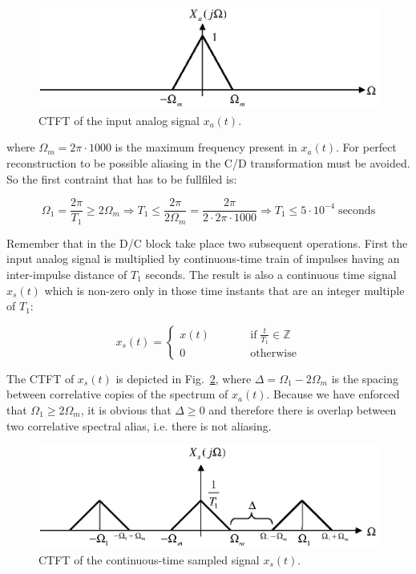 \documentclass[a4paper,11pt,oneside]{article}
\begin{document}
\begin{figure}[h!]
\centering
\includegraphics[width=.8\textwidth]{ctftxa.eps}
\caption{CTFT of the input analog signal $x_a(t)$.}
\label{ctftxa}
\end{figure}


where $\Omega_{m}=2\pi\cdot 1000$ is the maximum frequency present in $x_a(t)$. For perfect reconstruction to be possible aliasing in the C/D transformation must be avoided. So the first contraint that has to be fullfiled is:

\begin{equation}\label{const1}
\Omega_1=\frac{2\pi}{T_1}\geq 2\Omega_{m} \Rightarrow T_1\leq  \frac{2\pi}{2\Omega_{m}}=\frac{2\pi}{2\cdot 2\pi\cdot 1000}\Rightarrow T_1\leq 5\cdot 10^{-4} \;\textrm{seconds}
\end{equation}

Remember that in the D/C block take place two subsequent operations. First the input analog signal is multiplied by continuous-time train of impulses having an inter-impulse distance of $T_1$ seconds. The result is also a continuous time signal $x_s(t)$ which is non-zero only in those time instants that are an integer multiple of $T_1$:

\[
x_s(t)=\left\{ 
\begin{array}{lll}
x(t) &\qquad & \textrm{if}\; \frac{t}{T_1}\in\mathbb{Z}\\
0 & \qquad & \textrm{otherwise}
\end{array}
\right.
\]

The CTFT of $x_s(t)$ is depicted in Fig.~\ref{ctftxs}, where $\Delta=\Omega_1-2\Omega_m$ is the spacing between correlative copies of the spectrum of $x_a(t)$. Because we have enforced that $\Omega_1\geq 2\Omega_m$, it is obvious that $\Delta\geq 0$ and therefore there is overlap between two correlative spectral alias, i.e. there is not aliasing.

\begin{figure}[h!]
\centering
\includegraphics[width=.8\textwidth]{ctftxs.eps}
\caption{CTFT of the continuous-time sampled signal $x_s(t)$.}
\label{ctftxs}
\end{figure}
\end{document}
